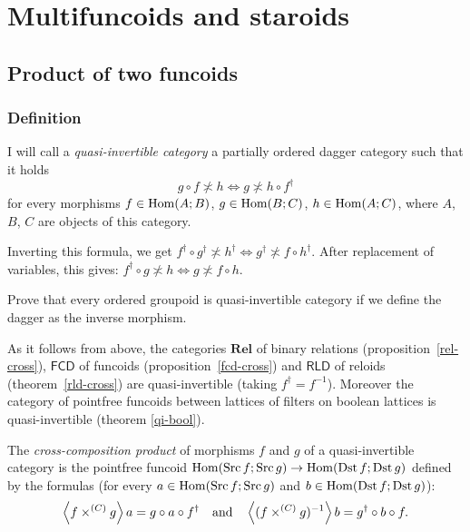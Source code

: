 
\chapter{\label{multi}Multifuncoids and staroids}


\section{Product of two funcoids}


\subsection{Definition}
\begin{defn}
I will call a \emph{quasi-invertible
category} a partially ordered dagger category such that it holds 
\begin{equation}
g\circ f\nasymp h\Leftrightarrow g\nasymp h\circ f^{\dagger}\label{invertible}
\end{equation}
for every morphisms $f\in\operatorname{Hom}(A;B)$, $g\in\operatorname{Hom}(B;C)$, $h\in\operatorname{Hom}(A;C)$,
where $A$, $B$, $C$ are objects of this category.
\end{defn}
Inverting this formula, we get $f^{\dagger}\circ g^{\dagger}\nasymp h^{\dagger}\Leftrightarrow g^{\dagger}\nasymp f\circ h^{\dagger}$.
After replacement of variables, this gives: $f^{\dagger}\circ g\nasymp h\Leftrightarrow g\nasymp f\circ h$.
\begin{xca}
Prove that every ordered groupoid is quasi-invertible category if
we define the dagger as the inverse morphism.
\end{xca}
As it follows from above, the categories $\mathbf{Rel}$ of binary
relations (proposition~\ref{rel-cross}), $\mathsf{FCD}$ of funcoids
(proposition~\ref{fcd-cross}) and $\mathsf{RLD}$ of reloids (theorem~\ref{rld-cross})
are quasi-invertible (taking $f^{\dagger}=f^{-1}$). Moreover the
category of pointfree funcoids between lattices of filters on boolean
lattices is quasi-invertible (theorem \ref{qi-bool}).
\begin{defn}
The \emph{cross-composition product}
of morphisms $f$ and $g$ of a quasi-invertible category is the pointfree
funcoid $\operatorname{Hom}(\operatorname{Src} f;\operatorname{Src} g)\rightarrow\operatorname{Hom}(\operatorname{Dst} f;\operatorname{Dst} g)$ defined
by the formulas (for every $a\in\operatorname{Hom}(\operatorname{Src} f;\operatorname{Src} g)$ and $b\in\operatorname{Hom}(\operatorname{Dst} f;\operatorname{Dst} g)$):
\[
\left\langle f\times^{(C)}g\right\rangle a=g\circ a\circ f^{\dagger}\hspace{1em}\text{and}\hspace{1em}\left\langle (f\times^{(C)}g)^{-1}\right\rangle b=g^{\dagger}\circ b\circ f.
\]

\end{defn}
